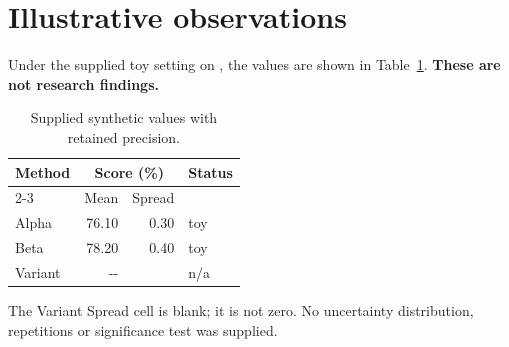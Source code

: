 \section{Illustrative observations}\label{sec:results}
Under the supplied toy setting on \datasetname{}, the values are shown in
Table~\ref{tab:results}. \textbf{These are not research findings.}
\begin{table}[htbp]
\centering\small
\caption{Supplied synthetic values with retained precision.}\label{tab:results}
\begin{tabular}{@{}lrrl@{}}
\toprule
Method & \multicolumn{2}{c}{Score (\%)} & Status\\
\cmidrule(lr){2-3}
& Mean & Spread &\\
\midrule
Alpha & 76.10 & 0.30 & toy\\
Beta & 78.20 & 0.40 & toy\\
Variant & -{}- & & n/a\\
\bottomrule
\end{tabular}
\end{table}
The Variant Spread cell is blank; it is not zero.
No uncertainty distribution, repetitions or significance test was supplied.
